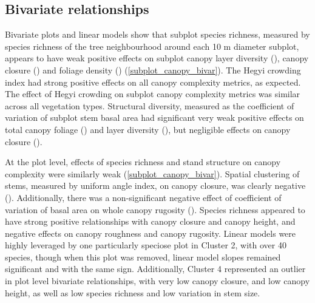 \documentclass[11pt,a4paper]{article}
\begin{document}
\subsection{Bivariate relationships}

Bivariate plots and linear models show that subplot species richness, measured by species richness of the tree neighbourhood around each 10 m diameter subplot, appears to have weak positive effects on subplot canopy layer diversity (\richLayerDiv{}), canopy closure (\richCover{}) and foliage density (\richFoliage{}) (\autoref{subplot_canopy_bivar}). The Hegyi crowding index had strong positive effects on all canopy complexity metrics, as expected. The effect of Hegyi crowding on subplot canopy complexity metrics was similar across all vegetation types. Structural diversity, measured as the coefficient of variation of subplot stem basal area had significant very weak positive effects on total canopy foliage (\baCovFoliage{}) and layer diversity (\baCovLayerDiv{}), but negligible effects on canopy closure (\baCovCover). 

At the plot level, effects of species richness and stand structure on canopy complexity were similarly weak (\autoref{subplot_canopy_bivar}). Spatial clustering of stems, measured by uniform angle index, on canopy closure, was clearly negative (\winkelCoverP{}). Additionally, there was a non-significant negative effect of coefficient of variation of basal area on whole canopy rugosity (\baCovRugosityP{}). Species richness appeared to have strong positive relationships with canopy closure and canopy height, and negative effects on canopy roughness and canopy rugosity. Linear models were highly leveraged by one particularly speciose plot in Cluster 2, with over 40 species, though when this plot was removed, linear model slopes remained significant and with the same sign. Additionally, Cluster 4 represented an outlier in plot level bivariate relationships, with very low canopy closure, and low canopy height, as well as low species richness and low variation in stem size.
\end{document}
